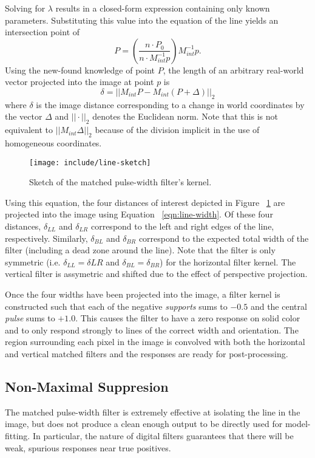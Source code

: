 \documentclass[11pt,twocolumn]{article}
\begin{document}
Solving for $\lambda$ results in a closed-form expression containing
only known parameters. Substituting this value into the equation of the
line yields an intersection point of
\begin{equation*}
 	P = \left(\frac{n \cdot P_0}{n \cdot M^{-1}_{int} p}\right) M^{-1}_{int} p.
	\label{eqn:line-point}
\end{equation*}
Using the new-found knowledge of point $P$, the length of an arbitrary real-world
vector projected into the image at point $p$ is
\begin{equation}
	\delta = ||M_{int} P - M_{int} (P + \Delta)||_2
	\label{eqn:line-width}
\end{equation}
where $\delta$ is the image distance corresponding to a change in world
coordinates by the vector $\Delta$ and $||\cdot||_2$ denotes the Euclidean
norm. Note that this is not equivalent to $||M_{int}\Delta||_2$ because of the
division implicit in the use of homogeneous coordinates.

\begin{figure}
	\centering
	\texttt{[image: include/line-sketch]}
	\caption{Sketch of the matched pulse-width filter's kernel.}
	\label{fig:line-sketch}
\end{figure}

Using this equation, the four distances of interest depicted in Figure
~\ref{fig:line-sketch} are projected into the image using Equation
~\ref{eqn:line-width}. Of these four distances, $\delta_{LL}$ and $\delta_{LR}$
correspond to the left and right edges of the line, respectively. Similarly,
$\delta_{BL}$ and $\delta_{BR}$ correspond to the expected total width of the
filter (including a dead zone around the line). Note that the filter is only
symmetric (i.e. $\delta_{LL} = \delta{LR}$ and $\delta_{BL} = \delta_{BR}$) for
the horizontal filter kernel. The vertical filter is assymetric and shifted due
to the effect of perspective projection.

Once the four widths have been projected into the image, a filter kernel is
constructed such that each of the negative \textit{supports} sums to $-0.5$
and the central \textit{pulse} sums to $+1.0$. This causes the filter to have
a zero response on solid color and to only respond strongly to lines of the
correct width and orientation. The region surrounding each pixel in the image
is convolved with both the horizontal and vertical matched filters and the
responses are ready for post-processing.

\subsection{Non-Maximal Suppresion}
\label{sec:line-max}
The matched pulse-width filter is extremely effective at isolating the line in
the image, but does not produce a clean enough output to be directly used for
model-fitting. In particular, the nature of digital filters guarantees that
there will be weak, spurious responses near true positives.
\end{document}
